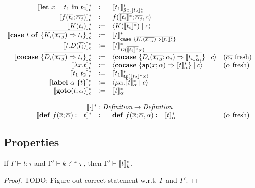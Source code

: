 \[\begin{array}{rcll}
    \translatestar{\letin{x}{t_1}{t_2}}{c} & \coloneq & \translatestar{t_1}{\tilde{\mu}x.\translatestar{t_2}{c}} & \\
    \translatestar{f(\overline{t_i}; \overline{\alpha_j})}{c} & \coloneq & f(\overline{\translatestar{t_i}{}}; \overline{\alpha_j}, c) & \\
    \translatestar{K(\overline{t_i})}{c} & \coloneq & \cut{K(\overline{\translatestar{t_i}{}})}{c} & \\
    \translatestar{\caseof{t}{\overline{K_i(\overline{x_{i,j}}) \Rightarrow t_i}}}{c} & \coloneq & \translatestar{t}{\case{\overline{K_i(\overline{x_{i,j}}) \Rightarrow \translatestar{t_i}{c}}}} & \\
    \translatestar{t.D(\overline{t_i})}{c} & \coloneq & \translatestar{t}{D(\overline{\translatestar{t_i}{}}; c)} & \\
    \translatestar{\cocase{\overline{D_i(\overline{x_{i,j}}) \Rightarrow t_i}}}{c} & \coloneq & \cut{\cocase{\overline{D_i(\overline{x_{i,j}}; \alpha_i) \Rightarrow \translatestar{t_i}{\alpha_i}}}}{c} & \fresh{\overline{\alpha_i}} \\
    \translatestar{\lambda x.t}{c} & \coloneq & \cut{\cocase{\mathtt{ap}(x; \alpha) \Rightarrow \translatestar{t}{\alpha}}}{c} & \fresh{\alpha} \\
    \translatestar{t_1\ t_2}{c} & \coloneq & \translatestar{t_1}{\mathtt{ap}(\translatestar{t_2}{}; c)} & \\
    \translatestar{\lab{\alpha}{t}}{c} & \coloneq & \cut{\mu \alpha.\translatestar{t}{\alpha}}{c} & \\
    \translatestar{\goto{t}{\alpha}}{c} & \coloneq & \translatestar{t}{\alpha} & \\
    \\
    \multicolumn{4}{c}{\translatestar{\cdot}{} : \emph{Definition} \rightarrow \emph{Definition}}\\
    \translatestar{\defi{f(\overline{x}; \overline{\alpha})}{t}}{} & \coloneq & \defi{f(\overline{x}; \overline{\alpha}, \alpha)}{\translatestar{t}{\alpha}} & \fresh{\alpha}
  \end{array}
\]

\subsection{Properties}
\label{subsec:translation:properties}

\begin{lemma}
  If $\Gamma \vdash t : \tau$ and $\Gamma' \vdash k :^{\text{\tiny cns}} \tau$, then $\Gamma' \vdash \llbracket t \rrbracket_{k}^{\ast}$.
\end{lemma}
\begin{proof}
  TODO: Figure out correct statement w.r.t. $\Gamma$ and $\Gamma'$.
\end{proof}

